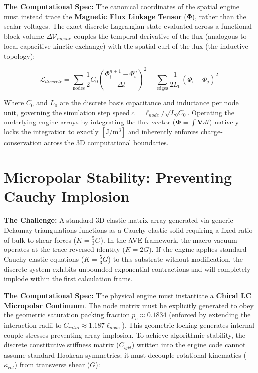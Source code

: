 \textbf{The Computational Spec:} The canonical coordinates of the spatial engine must instead trace the \textbf{Magnetic Flux Linkage Tensor} ($\mathbf{\Phi}$), rather than the scalar voltages. The exact discrete Lagrangian state evaluated across a functional block volume $\Delta \mathcal{V}_{engine}$ couples the temporal derivative of the flux (analogous to local capacitive kinetic exchange) with the spatial curl of the flux (the inductive topology):

\begin{equation}
    \mathcal{L}_{discrete} = \sum_{\text{nodes}} \frac{1}{2} C_0 \left( \frac{\Phi_i^{n+1} - \Phi_i^n}{\Delta t} \right)^2 - \sum_{\text{edges}} \frac{1}{2 L_0} (\Phi_i - \Phi_j)^2
\end{equation}

Where $C_0$ and $L_0$ are the discrete basis capacitance and inductance per node unit, governing the simulation step speed $c = \ell_{node}/\sqrt{L_0 C_0}$. Operating the underlying engine arrays by integrating the flux vector ($\mathbf{\Phi} = \int \mathbf{V} dt$) natively locks the integration to exactly $[\text{J}/\text{m}^3]$ and inherently enforces charge-conservation across the 3D computational boundaries.

\section{Micropolar Stability: Preventing Cauchy Implosion}

\textbf{The Challenge:} A standard 3D elastic matrix array generated via generic Delaunay triangulations functions as a Cauchy elastic solid requiring a fixed ratio of bulk to shear forces ($K = \frac{5}{3}G$). In the AVE framework, the macro-vacuum operates at the trace-reversed identity ($K = 2G$). If the engine applies standard Cauchy elastic equations ($K = \frac{5}{3}G$) to this substrate without modification, the discrete system exhibits unbounded exponential contractions and will completely implode within the first calculation frame.

\textbf{The Computational Spec:} The physical engine must instantiate a \textbf{Chiral LC Micropolar Continuum}. The node matrix must be explicitly generated to obey the geometric saturation packing fraction $p_c \approx 0.1834$ (enforced by extending the interaction radii to $C_{ratio} \approx 1.187 \ell_{node}$). This geometric locking generates internal couple-stresses preventing array implosion.
To achieve algorithmic stability, the discrete constitutive stiffness matrix ($C_{ijkl}$) written into the engine code cannot assume standard Hookean symmetries; it must decouple rotational kinematics ($\kappa_{rot}$) from transverse shear ($G$):

